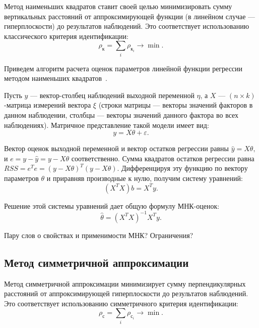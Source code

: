 Метод наименьших квадратов ставит своей целью минимизировать сумму вертикальных расстояний
от аппроксимирующей функции (в линейном случае --- гиперплоскости) до результатов наблюдений.
Это соответствует использованию классического критерия идентификации:
\begin{equation*}
  \rho_{\text{к}} = \sum_i \rho_{\text{к}_i} \rightarrow \min.
\end{equation*}

Приведем алгоритм расчета оценок параметров линейной функции
регрессии методом наименьших квадратов~\cite{wiki_lse}.

Пусть \( y \) --- вектор-столбец наблюдений выходной переменной \( \eta \),
а \( X \) --- \( (n \times k) \)-матрица измерений вектора \( \xi \)
(строки матрицы --- векторы значений факторов в данном наблюдении,
столбцы --- векторы значений данного фактора во всех наблюдениях).
Матричное представление такой модели имеет вид:
\begin{equation*}
  y = X \theta + \varepsilon.
\end{equation*}

Вектор оценок выходной переменной и вектор остатков регрессии равны
\( \hat{y} = X \theta, \) и \( e = y - \hat{y} = y - X \theta \) соответственно.
Сумма квадратов остатков регрессии равна \( RSS = e^T e = (y - X \theta)^T (y - X \theta) \).
Дифференцируя эту функцию по вектору параметров \( \theta \) и приравняв производные к нулю,
получим систему уравнений:
\begin{equation*}
  (X^T X)b = X^T y.
\end{equation*}

Решение этой системы уравнений дает общую формулу МНК-оценок:
\begin{equation}
  \hat{\theta} = (X^{T}X)^{-1}X^{T} y.
\end{equation}

{\color{red}
  Пару слов о свойствах и применимости МНК?
  Ограничения?
}

\subsection{Метод симметричной аппроксимации}

Метод симметричной аппроксимации минимизирует сумму перпендикулярных расстояний
от аппроксимирующей гиперплоскости до результатов наблюдений.
Это соответствует использованию симметричного критерия идентификации:
\begin{equation*}
  \rho_{\text{с}} = \sum_i \rho_{\text{с}_i} \rightarrow \min.
\end{equation*}


